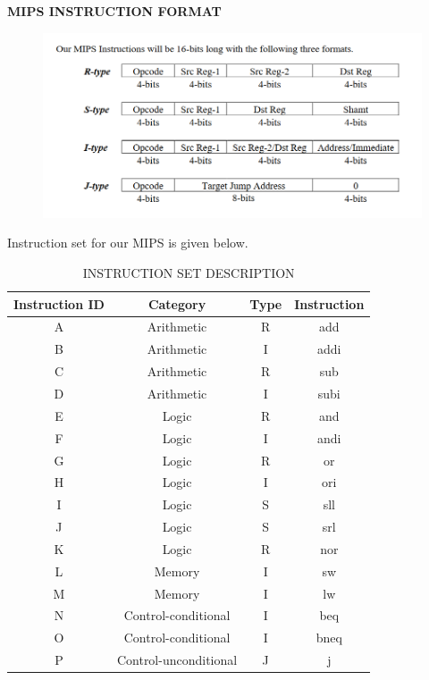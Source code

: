 \documentclass[a4paper]{article}
\begin{document}
\begin{center}
    \textbf{MIPS INSTRUCTION FORMAT}
\end{center}
\begin{figure}[H]
    \centering
    \includegraphics[width=1\linewidth]{InstructionFormat.pdf.png}
    \label{fig:enter-label}
\end{figure}

Instruction set for our MIPS is given below.
\begin{table}[H]
    \centering
    \caption{INSTRUCTION SET DESCRIPTION}
    \vspace{0.5cm}
    \begin{tabular}{|c|c|c|c|}
    \hline
    Instruction ID & Category & Type & Instruction\\
    \hline
    A & Arithmetic & R & add\\
    \hline
    B & Arithmetic & I & addi\\
    \hline
    C & Arithmetic & R & sub\\
    \hline
    D & Arithmetic & I & subi\\
    \hline
    E & Logic & R & and\\
    \hline
    F & Logic & I & andi\\
    \hline
    G & Logic & R & or\\
    \hline
    H & Logic & I & ori\\
    \hline
    I & Logic & S & sll\\
    \hline
    J & Logic & S & srl\\
    \hline
    K & Logic & R & nor\\
    \hline
    L & Memory & I & sw\\
    \hline
    M & Memory & I & lw\\
    \hline
    N & Control-conditional & I & beq\\
    \hline
    O & Control-conditional & I & bneq\\
    \hline
    P & Control-unconditional & J & j \\
    \hline
    \end{tabular}
\end{table}
\end{document}
